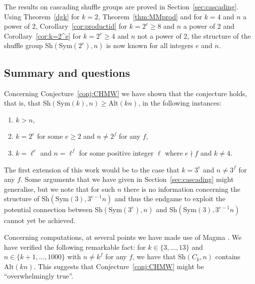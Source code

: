 \documentclass[12pt]{amsart}
\newtheorem{qn}[thm]{Question}
\theoremstyle{remark}
\theoremstyle{definition}
\newcommand{\sym}{\mathrm{Sym}}
\newcommand{\alt}{\mathrm{Alt}}
\newcommand{\sh}{\mathrm{Sh}}
\begin{document}
The results on cascading shuffle groups are proved in Section~\ref{sec:cascading}. Using Theorem~\ref{dgk} for $k=2$, Theorem~\ref{thm:MMprod} and \cite[Theorem 2.6]{CHMW} for $k=4$ and $n$ a power of 2,  Corollary~\ref{cor:productid} for $k=2^e \geqslant 8$ and $n$ a power of 2 and Corollary~\ref{cor:k=2^e} for $k=2^e \geqslant 4$ and $n$ not a power of 2, the structure of the shuffle group $\sh(\sym(2^e),n)$ is now known for all integers $e$ and $n$.



\subsection{Summary and questions}\label{sec: summary}

Concerning Conjecture~\ref{conj:CHMW} we have shown that  the conjecture holds, that is, that $\sh(\sym(k),n) \geqslant \alt(kn)$, in the following instances:
\begin{enumerate}
\item $k>n$,
\item $k=2^e$ for some $e\geqslant 2$ and $n \neq 2^f$ for any $f$,
\item $k=\ell^e$ and $n=\ell^f$ for some positive integer $\ell$ where $e \nmid f$ and $k\neq 4$.
\end{enumerate}
The first extension of this work would be to the case that $k=3^e$ and $n \neq 3^f$ for any $f$. Some arguments that we have given in Section~\ref{sec:cascading} might generalise, but we note that for such $n$ there is no information concerning the structure of $\sh(\sym(3),3^{e-1}n)$ and thus the endgame to exploit the potential connection between $\sh(\sym(3^e),n)$ and    $\sh(\sym(3), 3^{e-1}n)$ cannot yet be achieved.

Concerning computations,  at several points we have made use of  {\sc Magma}  \cite{magma}. We have verified 
the following remarkable fact: for $k \in \{3,\dots,13\}$ and $n \in \{k+1,\dots,1000\}$ with $n \neq k^f$ for any $f$, we have that $\sh(C_k,n)$ contains $\alt(kn)$.
This suggests that Conjecture~\ref{conj:CHMW} might be ``overwhelmingly true''.
%
\end{document}
